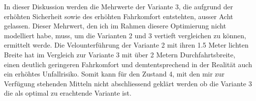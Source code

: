 In dieser Diskussion werden die Mehrwerte der Variante 3, die aufgrund der erhöhten Sicherheit sowie des erhöhten Fahrkomfort entstehten, ausser Acht gelassen. 
Dieser Mehrwert, den ich im Rahmen diesere Optimierung nicht modelliert habe, muss, um die Varianten 2 und 3 vertieft vergleichen zu können, ermittelt werde. Die Velounterführung der Variante 2 mit ihren 1.5 Meter lichten Breite hat im Vergleich zur Variante 3 mit über 2 Metern Durchfahrtsbreite, einen deutlich geringeren Fahrkomfort und demtentsprechend in der Realität auch ein erhöhtes Unfallrisiko. Somit kann für den Zustand 4, mit den mir zur Verfügung stehenden Mitteln nicht abschliessend geklärt werden ob die Variante 3 die als optimal zu erachtende Variante ist.
      

%

